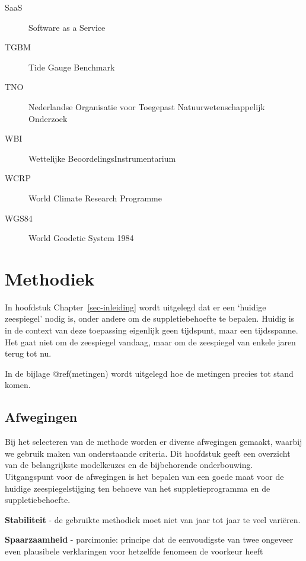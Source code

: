 \documentclass[ddraft]{deltares_report}
\begin{document}
\begin{description}
\item[\label{acronyms_SaaS}{SaaS}]
Software as a Service
\item[\label{acronyms_TGBM}{TGBM}]
Tide Gauge Benchmark
\item[\label{acronyms_TNO}{TNO}]
Nederlandse Organisatie voor Toegepast Natuurwetenschappelijk Onderzoek
\item[\label{acronyms_WBI}{WBI}]
Wettelijke BeoordelingsInstrumentarium
\item[\label{acronyms_WCRP}{WCRP}]
World Climate Research Programme
\item[\label{acronyms_WGS84}{WGS84}]
World Geodetic System 1984
\end{description}


\chapter{Methodiek}\label{methodiek}

In hoofdstuk Chapter~\ref{sec-inleiding} wordt uitgelegd dat er een
`huidige zeespiegel' nodig is, onder andere om de suppletiebehoefte te
bepalen. Huidig is in de context van deze toepassing eigenlijk geen
tijdspunt, maar een tijdsspanne. Het gaat niet om de zeespiegel vandaag,
maar om de zeespiegel van enkele jaren terug tot nu.

In de bijlage @ref(metingen) wordt uitgelegd hoe de metingen precies tot
stand komen.

\section{Afwegingen}\label{afwegingen}

Bij het selecteren van de methode worden er diverse afwegingen gemaakt,
waarbij we gebruik maken van onderstaande criteria. Dit hoofdstuk geeft
een overzicht van de belangrijkste modelkeuzes en de bijbehorende
onderbouwing. Uitgangspunt voor de afwegingen is het bepalen van een
goede maat voor de huidige zeespiegelstijging ten behoeve van het
suppletieprogramma en de suppletiebehoefte.

\textbf{Stabiliteit} - de gebruikte methodiek moet niet van jaar tot
jaar te veel variëren.

\textbf{Spaarzaamheid} - parcimonie: principe dat de eenvoudigste van
twee ongeveer even plausibele verklaringen voor hetzelfde fenomeen de
voorkeur heeft
\end{document}
